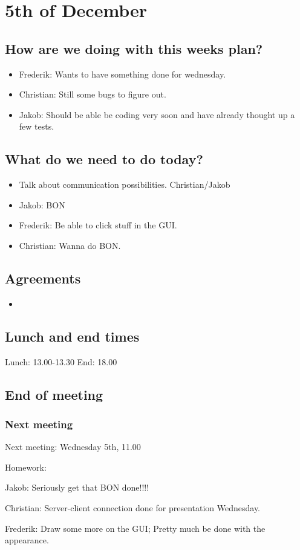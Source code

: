\section{5th of December}
\subsection{How are we doing with this weeks plan?}
\begin{itemize}
\item Frederik: Wants to have something done for wednesday.
\item Christian: Still some bugs to figure out.
\item Jakob: Should be able be coding very soon and have already thought up a few tests.
\end{itemize}

\subsection{What do we need to do today?}
\begin{itemize}
\item Talk about communication possibilities. Christian/Jakob
\item Jakob: BON
\item Frederik: Be able to click stuff in the GUI.
\item Christian: Wanna do BON.
\end{itemize}

\subsection{Agreements}
\begin{itemize}
\item 
\end{itemize}
\subsection{Lunch and end times}
Lunch:
13.00-13.30
End:
18.00
\subsection{End of meeting}
\subsubsection{Next meeting}
Next meeting: Wednesday 5th, 11.00

Homework:

Jakob: Seriously get that BON done!!!!

Christian: Server-client connection done for presentation Wednesday. 

Frederik: Draw some more on the GUI; Pretty much be done with the appearance.
